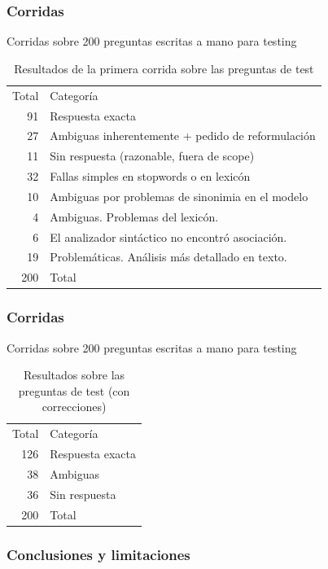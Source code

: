 \begin{frame}
\frametitle{Corridas}
Corridas sobre 200 preguntas escritas a mano para testing
\begin{center}
\begin{table}[h]
\centering
\begin{tabular}{| r |  p{12cm} | }

Total & Categoría \\ 
91 & Respuesta exacta \\ 
27 & Ambiguas inherentemente + pedido de reformulación \\ 
11 & Sin respuesta (razonable, fuera de scope) \\
32 & Fallas simples en stopwords o en lexicón \\
10 & Ambiguas por problemas de sinonimia en el modelo \\
4 & Ambiguas. Problemas del lexicón. \\
6 & El analizador sintáctico no encontró asociación. \\
19 & Problemáticas. Análisis más detallado en texto. \\
200 & Total \\
\end{tabular}
\caption{Resultados de la primera corrida sobre las preguntas de test}
\label{table:popescu-results-1}
\end{table}
\end{center}
\end{frame}

\begin{frame}
\frametitle{Corridas}
Corridas sobre 200 preguntas escritas a mano para testing
\begin{center}
\begin{table}[h]
\centering
\begin{tabular}{| r |  p{12cm} |}
Total & Categoría \\ 
126 & Respuesta exacta \\ 
38 & Ambiguas \\ 
36 & Sin respuesta\\ 
200 & Total \\ 

\end{tabular}
\caption{Resultados sobre las preguntas de test (con correcciones)}
\label{table:popescu-results-3}
\end{table}
\end{center}
\end{frame}


\subsubsection*{Conclusiones y limitaciones}


